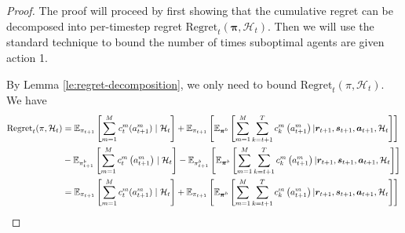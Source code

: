 \begin{proof}
   The proof will proceed by first showing that the cumulative regret can be decomposed into per-timestep regret $\text{Regret}_t(\bm{\pi},\mathcal{H}_t)$. Then we will use the standard technique to bound the number of times suboptimal agents are given action 1. 
   
   By Lemma \ref{le:regret-decomposition}, we only need to bound $\text{Regret}_t(\pi,\mathcal{H}_t)$. We have
    \begin{align*}
         \text{Regret}_t(\pi,\mathcal{H}_t)&=\E_{\pi_{t+1}}\left[\sum_{m=1}^M c_{t}^m(a_{t+1}^m)\mid\mathcal{H}_t\right]+\E_{\pi_{t+1}}\left[\E_{\bm{\pi}^b}\left[\sum_{m=1}^M\sum_{k=t+1}^T c_k^m\left(a_{t+1}^m\right)|\bm{r}_{t+1},\bm{s}_{t+1},\bm{a}_{t+1},\mathcal{H}_t\right]\right]\\&-\E_{\pi_{t+1}^b}\left[\sum_{m=1}^M c_{t}^m\left(a_{t+1}^m\right)\mid \mathcal{H}_t\right]-\E_{\pi_{t+1}^b}\left[\E_{\bm{\pi}^b}\left[\sum_{m=1}^M\sum_{k=t+1}^T c_k^m\left(a_{t+1}^m\right)|\bm{r}_{t+1},\bm{s}_{t+1},\bm{a}_{t+1},\mathcal{H}_t\right]\right]\\
         &=\E_{\pi_{t+1}}\left[\sum_{m=1}^M c_{t}^m(a_{t+1}^m)\mid\mathcal{H}_t\right]+\E_{\pi_{t+1}}\left[\E_{\bm{\pi}^b}\left[\sum_{m=1}^M\sum_{k=t+1}^T c_k^m\left(a_{t+1}^m\right)|\bm{r}_{t+1},\bm{s}_{t+1},\bm{a}_{t+1},\mathcal{H}_t\right]\right]\\

\end{align*}
\end{proof}
